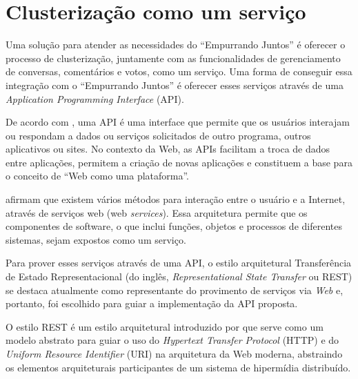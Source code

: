 \chapter{Clusterização como um serviço} \label{cap:proposta}

  Uma solução para atender as necessidades do ``Empurrando Juntos'' é oferecer
  o processo de clusterização, juntamente com as funcionalidades de gerenciamento
  de conversas, comentários e votos, como um serviço.
  Uma forma de conseguir essa integração com o ``Empurrando Juntos'' é oferecer
  esses serviços através de uma \textit{Application Programming Interface} (API).

  De acordo com , uma API é uma interface que permite que os 
  usuários interajam ou respondam a dados ou serviços solicitados de outro programa, outros
  aplicativos ou sites. No contexto da Web, as APIs facilitam a troca de dados entre 
  aplicações, permitem a criação de novas aplicações e constituem a base para o conceito de 
  ``Web como uma plataforma''.

   afirmam que existem vários métodos para interação entre o  
  usuário e a Internet, através de serviços web (web \textit{services}).
  Essa arquitetura permite que os componentes de software, o que inclui funções,
  objetos e processos de diferentes sistemas, sejam expostos como um serviço.

  Para prover esses serviços através de uma API, o estilo arquitetural Transferência de Estado 
  Representacional (do inglês, \textit{Representational State Transfer} ou REST)
  se destaca atualmente como representante do provimento de serviços via \textit{Web} e, portanto, foi escolhido para
  guiar a implementação da API proposta.

  O estilo REST é um estilo arquitetural introduzido por  que serve como um modelo abstrato
  para guiar o uso do \textit{Hypertext Transfer Protocol} (HTTP) e do \textit{Uniform Resource Identifier} (URI)
  na arquitetura da Web moderna, abstraindo os elementos arquiteturais participantes de um sistema de
  hipermídia distribuído.
  
  
